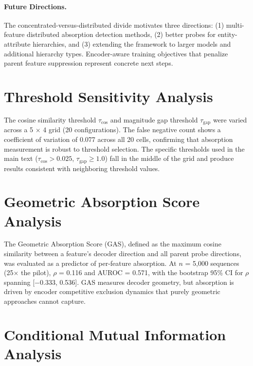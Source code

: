 \documentclass{article}
\begin{document}
\paragraph{Future Directions.} The concentrated-versus-distributed divide motivates three directions: (1) multi-feature distributed absorption detection methods, (2) better probes for entity-attribute hierarchies, and (3) extending the framework to larger models and additional hierarchy types. Encoder-aware training objectives that penalize parent feature suppression represent concrete next steps.




\appendix

\section{Threshold Sensitivity Analysis}
\label{app:threshold}

The cosine similarity threshold $\tau_{\cos}$ and magnitude gap threshold $\tau_{\text{gap}}$ were varied across a 5 $\times$ 4 grid (20 configurations). The false negative count shows a coefficient of variation of 0.077 across all 20 cells, confirming that absorption measurement is robust to threshold selection. The specific thresholds used in the main text ($\tau_{\cos} > 0.025$, $\tau_{\text{gap}} \geq 1.0$) fall in the middle of the grid and produce results consistent with neighboring threshold values.

\section{Geometric Absorption Score Analysis}
\label{app:gas}

The Geometric Absorption Score (GAS), defined as the maximum cosine similarity between a feature's decoder direction and all parent probe directions, was evaluated as a predictor of per-feature absorption. At $n$ = 5{,}000 sequences (25$\times$ the pilot), $\rho$ = 0.116 and AUROC = 0.571, with the bootstrap 95\% CI for $\rho$ spanning [$-$0.333, 0.536]. GAS measures decoder geometry, but absorption is driven by encoder competitive exclusion dynamics that purely geometric approaches cannot capture.

\section{Conditional Mutual Information Analysis}
\label{app:cmi}
\end{document}
